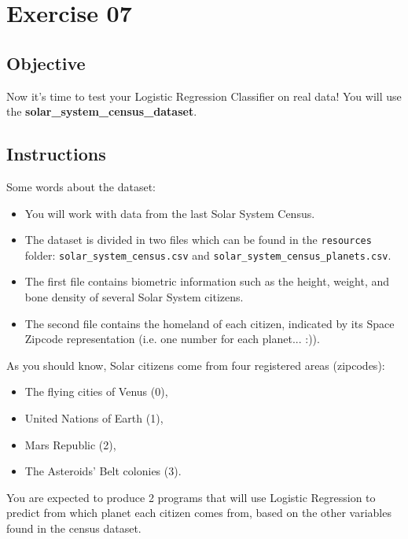 \chapter{Exercise 07}
%
{}
\makeheaderfilesforbidden


\section*{Objective}
Now it's time to test your Logistic Regression Classifier on real data!  
You will use the \textbf{solar\_system\_census\_dataset}. 

\section*{Instructions}
Some words about the dataset:
\begin{itemize}
  \item You will work with data from the last Solar System Census.
  \item The dataset is divided in two files which can be found in the \texttt{resources} folder: \texttt{solar\_system\_census.csv} and \texttt{solar\_system\_census\_planets.csv}.
  \item The first file contains biometric information such as the height, weight, and bone density of several Solar System citizens.
  \item The second file contains the homeland of each citizen, indicated by its Space Zipcode representation (i.e. one number for each planet... :)).
\end{itemize}

\newpage

As you should know, Solar citizens come from four registered areas (zipcodes): 
\begin{itemize}
  \item The flying cities of Venus (0), 
  \item United Nations of Earth (1), 
  \item Mars Republic (2), 
  \item The Asteroids' Belt colonies (3).
\end{itemize}


You are expected to produce 2 programs that will use Logistic Regression to predict from which planet each citizen comes from, based on the other variables found in the census dataset.  

